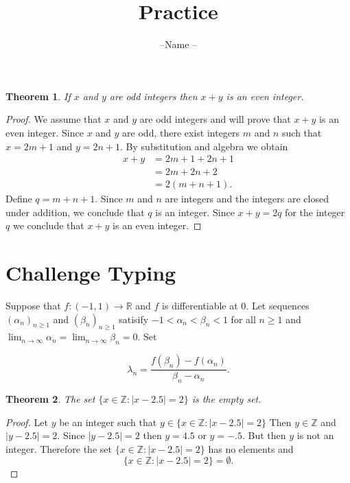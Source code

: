 \documentclass{article}  %
\title{Practice}
\author{--Name --}
\date{}
\newtheorem*{thm}{Theorem}
\newcommand{\Z}{\mathbb{Z}}
\newcommand{\R}{\mathbb{R}}
\begin{document}
\maketitle  %

\begin{thm}
If $x$ and $y$ are odd integers then $x+y$ is an even integer.
\end{thm}

\begin{proof}
We assume that $x$ and $y$ are odd integers and will prove that $x+y$ is an even integer. Since $x$ and $y$ are odd, there exist integers $m$ and $n$ such that $x=2m+1$ and $y=2n+1$.  By substitution and algebra we obtain
\begin{align*}
x+y &= 2m+1 + 2n + 1\\
&= 2m+2n+2\\
&=2(m+n+1).
\end{align*}
Define $q=m+n+1$.  Since $m$ and $n$ are integers and the integers are closed under addition, we conclude that $q$ is an integer. Since $x+y=2q$ for the integer $q$ we conclude that $x+y$ is an even integer.
\end{proof}


\vspace{.15in}

\section*{Challenge Typing}


Suppose that $f:(-1,1)\to \R$ and $f$ is differentiable at $0$. Let sequences $(\alpha_n)_{n\geq1}$ and $(\beta_n)_{n\geq1}$ satisify $-1<\alpha_n<\beta_n<1$ for all $n\geq 1$ and $\displaystyle{\lim_{n\to\infty}} \alpha_n = \displaystyle{\lim_{n\to\infty}} \beta_n = 0$. Set 
	
		$$\lambda_n = \frac{f(\beta_n) -f(\alpha_n)}{\beta_n-\alpha_n} . $$

\newpage

\begin{thm}
The set $\{ x\in\Z : |x-2.5| = 2 \}$ is the empty set.
\end{thm}

\begin{proof}
Let $y$ be an integer such that $y \in \{ x\in\Z : |x-2.5| = 2 \}$  Then $y\in \mathbb{Z}$ and $|y-2.5| = 2$.  Since $|y-2.5| = 2$ then $y = 4.5$ or $y=-.5$.  But then $y$ is not an integer.  Therefore the set $\{ x\in\Z : |x-2.5| = 2 \}$ has no elements and
\[\{ x\in\Z : |x-2.5| = 2 \} = \emptyset.\]
\end{proof}
\end{document}
